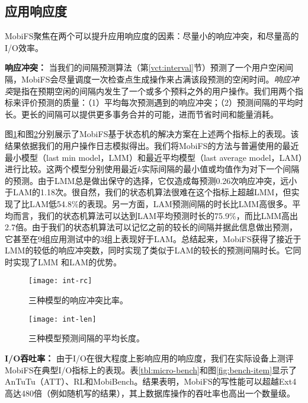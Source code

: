 \subsection{应用响应度} \label{vct:eval-resp}

MobiFS聚焦在两个可以提升应用响应度的因素：尽量小的响应冲突，和尽量高的I/O效率。

\noindent\textbf{响应冲突：}
当我们的间隔预测算法（第\ref{vct:interval}节）预测了一个用户空闲间隔，MobiFS会尽量调度一次检查点生成操作来占满该段预测的空闲时间。\emph{响应冲突}是指在预期空闲的间隔内发生了一个或多个预料之外的用户操作。我们用两个指标来评价预测的质量：（1）平均每次预测遇到的响应冲突；（2）预测间隔的平均时长。更长的间隔可以提供更多事务合并的可能，进而节省时间和能量消耗。

图\ref{fig:int-rc}和图\ref{fig:int-len}分别展示了MobiFS基于状态机的解决方案在上述两个指标上的表现。该结果依据我们的用户操作日志模拟得出。我们将MobiFS的方法与普遍使用的最近最小模型（last min model，LMM）和最近平均模型（last average model，LAM）进行比较。这两个模型分别使用最近$k$实际间隔的最小值或均值作为对下一个间隔的预测。由于LMM总是做出保守的选择，它仅造成每预测0.26次响应冲突，远小于LAM的1.18次。很自然，我们的状态机算法很难在这个指标上超越LMM，但实现了比LAM低54.8\%的表现。另一方面，LAM预测间隔的时长比LMM高很多。平均而言，我们的状态机算法可以达到LAM平均预测时长的75.9\%，而比LMM高出2.7倍。由于我们的状态机算法可以记忆之前的较长的间隔并据此信息做出预测，它甚至在9组应用测试中的3组上表现好于LAM。总结起来，MobiFS获得了接近于LMM的较低的响应冲突数，同时实现了类似于LAM的较长的预测间隔时长。它同时实现了LMM 和LAM的优势。

\begin{figure}[!ht]
  \centering
  \texttt{[image: int-rc]}
  \caption{三种模型的响应冲突比率。}
  \label{fig:int-rc}
\end{figure}

\begin{figure}[!ht]
  \centering
  \texttt{[image: int-len]}
  \caption{三种模型预测间隔的平均长度。}
  \label{fig:int-len}
\end{figure}

\noindent\textbf{I/O吞吐率：}
由于I/O在很大程度上影响应用的响应度，我们在实际设备上测评MobiFS在典型I/O指标上的表现。表\ref{tbl:micro-bench}和图\ref{fig:bench-item}显示了AnTuTu（ATT）、RL和MobiBench。结果表明，MobiFS的写性能可以超越Ext4高达480倍（例如随机写的结果），其上数据库操作的吞吐率也高出一个数量级。

